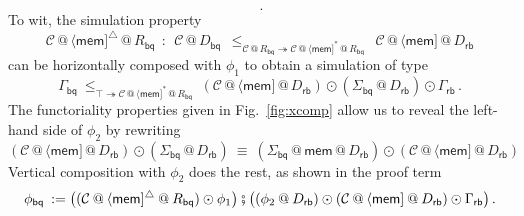 \documentclass[acmsmall,screen,review,anonymous]{acmart}
\newcommand{\kw}[1]{\ensuremath{ \mathsf{#1} }}
\newcommand{\vcomp}{\fatsemi}
\begin{document}
\begin{example}
\[%
%
%
%
%
  \: .
\]
To wit, the simulation property
\[
 \mathcal{C} \mathbin@ \langle \kw{mem} ]^\triangle \mathbin@ R_\kw{bq}
 \:\::\:\:
 \mathcal{C} \mathbin@ D_\kw{bq}
 \:\:\le_{\mathcal{C} \mathbin@ R_\kw{bq} \twoheadrightarrow
      \mathcal{C} \mathbin@ \langle \kw{mem} ]^*  \mathbin@ R_\kw{bq}}\:\:
 \mathcal{C} \mathbin@ \langle \kw{mem} ] \mathbin@ D_\kw{rb}
\]
can be horizontally composed with $\phi_1$ to obtain a simulation of type
\[
  \Gamma_\kw{bq} \: \le_{\top \twoheadrightarrow
    \mathcal{C} \mathbin@ \langle \kw{mem}]^* \mathbin@ R_\kw{bq}} \:
  (\mathcal{C} \mathbin@ \langle \kw{mem} ] \mathbin@ D_\kw{rb}) \odot
    (\Sigma_\kw{bq} \mathbin@ D_\kw{rb}) \odot \Gamma_\kw{rb}
  \,.
\]
The functoriality properties given in Fig.~\ref{fig:xcomp}
allow us to reveal the left-hand side of $\phi_2$ by rewriting
\[
 (\mathcal{C} \mathbin@ \langle \kw{mem} ] \mathbin@ D_\kw{rb}) \odot
   (\Sigma_\kw{bq} \mathbin@ D_\kw{rb})
 \: \equiv \:
 (\Sigma_\kw{bq} \mathbin@ \kw{mem} \mathbin@ D_\kw{rb}) \odot
   (\mathcal{C} \mathbin@ \langle \kw{mem} ] \mathbin@ D_\kw{rb})
\]
Vertical composition with $\phi_2$ does the rest,
as shown in the proof term
\[
  \phi_\kw{bq} \: :=
  \big( (\mathcal{C} \mathbin@
   \langle \kw{mem} ]^\triangle \mathbin@
   R_\kw{bq}) \odot \phi_1 \big) \vcomp
  \big( (\phi_2 \mathbin@ D_\kw{rb}) \odot
        (\mathcal{C} \mathbin@ \langle \kw{mem} ] \mathbin@ D_\kw{rb}) \odot
        \Gamma_\kw{rb} \big)
  \,.
\]
\end{example}
\end{document}
